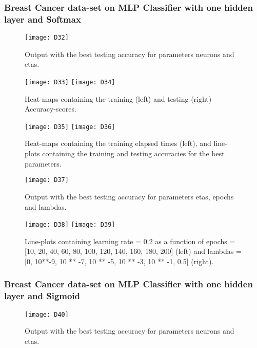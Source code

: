 \subsubsection{Breast Cancer data-set on MLP Classifier with one hidden layer and Softmax}
\label{chap:Breast Cancer data-set on MLP Classifier with one hidden layer and Softmax}

\begin{figure}[H]
\label{fig:D20}
\centering
\texttt{[image: D32]}
\caption{Output with the best testing accuracy for parameters neurons and etas.}
\end{figure}

\begin{figure}[H]
\label{fig:D21}
\centering
\texttt{[image: D33]}
\texttt{[image: D34]}
\caption{Heat-maps containing the training (left) and testing (right) Accuracy-scores.}
\end{figure}

\begin{figure}[H]
\label{fig:D22}
\centering
\texttt{[image: D35]}
\texttt{[image: D36]}
\caption{Heat-maps containing the training elapsed times (left), and line-plots containing the training and testing accuracies for the best parameters.}
\end{figure}

\begin{figure}[H]
\label{fig:D23}
\centering
\texttt{[image: D37]}
\caption{Output with the best testing accuracy for parameters etas, epochs and lambdas.}
\end{figure}

\begin{figure}[H]
\label{fig:D24}
\centering
\texttt{[image: D38]}
\texttt{[image: D39]}
\caption{Line-plots containing learning rate = 0.2 as a function of epochs = [10, 20, 40, 60, 80, 100, 120, 140, 160, 180, 200] (left) and lambdas = [0, 10**-9, 10 ** -7, 10 ** -5, 10 ** -3, 10 ** -1, 0.5] (right).}
\end{figure}

\subsubsection{Breast Cancer data-set on MLP Classifier with one hidden layer and Sigmoid}
\label{chap:Breast Cancer data-set on MLP Classifier with one hidden layer and Sigmoid}

\begin{figure}[H]
\label{fig:D25}
\centering
\texttt{[image: D40]}
\caption{Output with the best testing accuracy for parameters neurons and etas.}
\end{figure}

